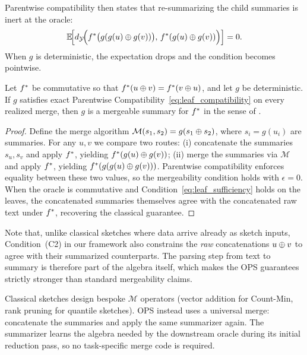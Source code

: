 Parentwise compatibility then states that re-summarizing the child summaries is inert at the oracle:
\[
    \mathbb{E}\!\Big[d_{\mathcal{Y}}\!\Big(f^{\ast}\big(g(g(u)\oplus g(v))\big),\, f^{\ast}(g(u)\oplus g(v))\Big)\Big]=0.
\]
When $g$ is deterministic, the expectation drops and the condition becomes pointwise.

\begin{proposition}
\label{prop:mergeable_reduction}
Let $f^{\ast}$ be commutative so that $f^{\ast}(u\oplus v)=f^{\ast}(v\oplus u)$, and let $g$ be deterministic. If $g$ satisfies exact Parentwise Compatibility~\eqref{eq:leaf_compatibility} on every realized merge, then $g$ is a mergeable summary for $f^{\ast}$ in the sense of \citet{Agarwal2013MergeableTODS}.
\end{proposition}

\begin{proof}
Define the merge algorithm $\mathcal{M}(s_1,s_2)=g(s_1\oplus s_2)$, where $s_i=g(u_i)$ are summaries. For any $u,v$ we compare two routes: (i) concatenate the summaries $s_u,s_v$ and apply $f^{\ast}$, yielding $f^{\ast}(g(u)\oplus g(v))$; (ii) merge the summaries via $\mathcal{M}$ and apply $f^{\ast}$, yielding $f^{\ast}(g(g(u)\oplus g(v)))$. Parentwise compatibility enforces equality between these two values, so the mergeability condition holds with $\epsilon=0$. When the oracle is commutative and Condition~\eqref{eq:leaf_sufficiency} holds on the leaves, the concatenated summaries themselves agree with the concatenated raw text under $f^{\ast}$, recovering the classical guarantee.
\end{proof}

Note that, unlike classical sketches where data arrive already as sketch inputs, Condition~(C2) in our framework also constrains the \emph{raw} concatenations $u\oplus v$ to agree with their summarized counterparts. The parsing step from text to summary is therefore part of the algebra itself, which makes the OPS guarantees strictly stronger than standard mergeability claims.

\begin{remark}\label{rem:universal_merge}
Classical sketches design bespoke $\mathcal{M}$ operators (vector addition for Count-Min, rank pruning for quantile sketches). OPS instead uses a universal merge: concatenate the summaries and apply the same summarizer again. The summarizer learns the algebra needed by the downstream oracle during its initial reduction pass, so no task-specific merge code is required.
\end{remark}

